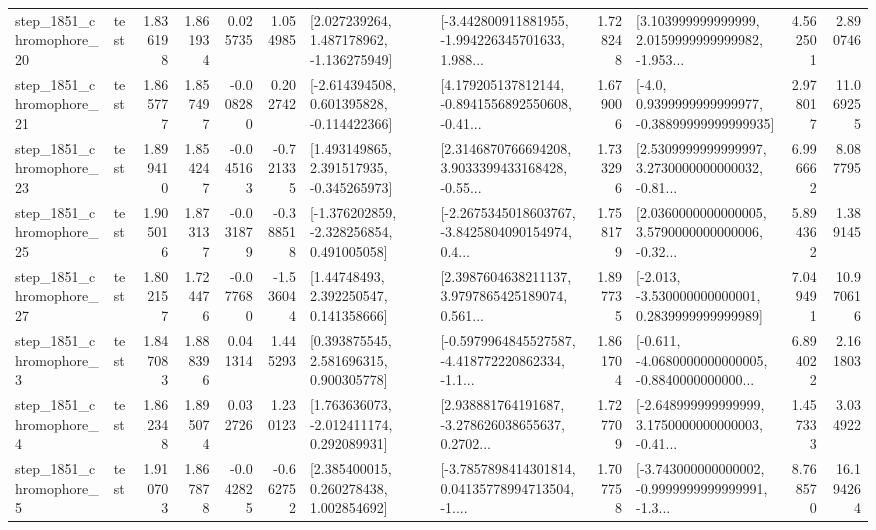 \begin{tabular}{llrrrrllrlrr}
 step\_1851\_chromophore\_20 &      test &      1.836198 &    1.861934 &      0.025735 &  1.054985 &    [2.027239264, 1.487178962, -1.136275949] &  [-3.442800911881955, -1.994226345701633, 1.988... &       1.728248 &  [3.103999999999999, 2.0159999999999982, -1.953... &            4.562501 &          2.890746 \\
 step\_1851\_chromophore\_21 &      test &      1.865777 &    1.857497 &     -0.008280 &  0.202742 &   [-2.614394508, 0.601395828, -0.114422366] &  [4.179205137812144, -0.8941556892550608, -0.41... &       1.679006 &   [-4.0, 0.9399999999999977, -0.38899999999999935] &            2.978017 &         11.069255 \\
 step\_1851\_chromophore\_23 &      test &      1.899410 &    1.854247 &     -0.045163 & -0.721335 &    [1.493149865, 2.391517935, -0.345265973] &  [2.3146870766694208, 3.9033399433168428, -0.55... &       1.733296 &  [2.5309999999999997, 3.2730000000000032, -0.81... &            6.996662 &          8.087795 \\
 step\_1851\_chromophore\_25 &      test &      1.905016 &    1.873137 &     -0.031879 & -0.388518 &   [-1.376202859, -2.328256854, 0.491005058] &  [-2.2675345018603767, -3.8425804090154974, 0.4... &       1.758179 &  [2.0360000000000005, 3.5790000000000006, -0.32... &            5.894362 &          1.389145 \\
 step\_1851\_chromophore\_27 &      test &      1.802157 &    1.724476 &     -0.077680 & -1.536044 &      [1.44748493, 2.392250547, 0.141358666] &  [2.3987604638211137, 3.9797865425189074, 0.561... &       1.897735 &   [-2.013, -3.530000000000001, 0.2839999999999989] &            7.049491 &         10.970616 \\
  step\_1851\_chromophore\_3 &      test &      1.847083 &    1.888396 &      0.041314 &  1.445293 &     [0.393875545, 2.581696315, 0.900305778] &  [-0.5979964845527587, -4.418772220862334, -1.1... &       1.861704 &  [-0.611, -4.0680000000000005, -0.8840000000000... &            6.894022 &          2.161803 \\
  step\_1851\_chromophore\_4 &      test &      1.862348 &    1.895074 &      0.032726 &  1.230123 &    [1.763636073, -2.012411174, 0.292089931] &  [2.938881764191687, -3.278626038655637, 0.2702... &       1.727709 &  [-2.648999999999999, 3.1750000000000003, -0.41... &            1.457333 &          3.034922 \\
  step\_1851\_chromophore\_5 &      test &      1.910703 &    1.867878 &     -0.042825 & -0.662752 &     [2.385400015, 0.260278438, 1.002854692] &  [-3.7857898414301814, 0.04135778994713504, -1.... &       1.707758 &  [-3.743000000000002, -0.9999999999999991, -1.3... &            8.768570 &         16.194264 \\

\end{tabular}

